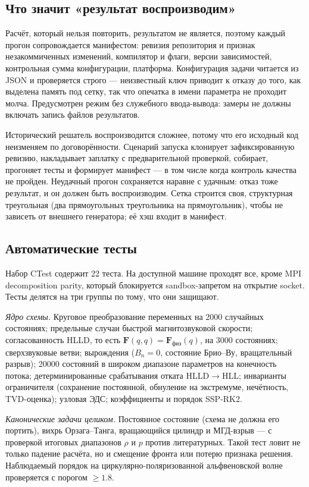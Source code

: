 \documentclass[12pt,a4paper]{article}
\begin{document}
\subsection{Что значит «результат воспроизводим»}

Расчёт, который нельзя повторить, результатом не является, поэтому каждый прогон
сопровождается манифестом: ревизия репозитория и признак незакоммиченных
изменений, компилятор и флаги, версии зависимостей, контрольная сумма
конфигурации, платформа. Конфигурация задачи читается из JSON и проверяется
строго — неизвестный ключ приводит к отказу до того, как выделена память под
сетку, так что опечатка в имени параметра не проходит молча. Предусмотрен режим
без служебного ввода-вывода: замеры не должны включать запись файлов
результатов.

Исторический решатель воспроизводится сложнее, потому что его исходный код
неизменяем по договорённости. Сценарий запуска клонирует зафиксированную
ревизию, накладывает заплатку с предварительной проверкой, собирает, прогоняет
тесты и формирует манифест — в том числе когда контроль качества не пройден.
Неудачный прогон сохраняется наравне с удачным: отказ тоже результат, и он
должен быть воспроизводим. Сетка строится своя, структурная треугольная (два
прямоугольных треугольника на прямоугольник), чтобы не зависеть от внешнего
генератора; её хэш входит в манифест.

\subsection{Автоматические тесты}

Набор CTest содержит 22 теста. На доступной машине проходят все, кроме MPI
decomposition parity, который блокируется sandbox-запретом на открытие socket.
Тесты делятся на три группы по
тому, что они защищают.

\emph{Ядро схемы.} Круговое преобразование переменных на 2000 случайных
состояниях; предельные случаи быстрой магнитозвуковой скорости; согласованность
HLLD, то есть $\mathbf F(q,q)=\mathbf F_{\text{физ}}(q)$, на 3000 состояниях;
сверхзвуковые ветви; вырождения ($B_n=0$, состояние Брио--Ву, вращательный
разрыв); 20000 состояний в широком диапазоне параметров на конечность потока;
детерминированные срабатывания отката HLLD$\to$HLL; инварианты ограничителя
(сохранение постоянной, обнуление на экстремуме, нечётность, TVD-оценка);
узловая ЭДС; коэффициенты и порядок SSP-RK2.

\emph{Канонические задачи целиком.} Постоянное состояние (схема не должна его
портить), вихрь Орзага--Танга, вращающийся цилиндр и МГД-взрыв — с проверкой
итоговых диапазонов $\rho$ и $p$ против литературных. Такой тест ловит не только
падение расчёта, но и смещение фронта или потерю признака решения. Наблюдаемый
порядок на циркулярно-поляризованной альфвеновской волне проверяется с порогом
$\geq1.8$.
\end{document}
